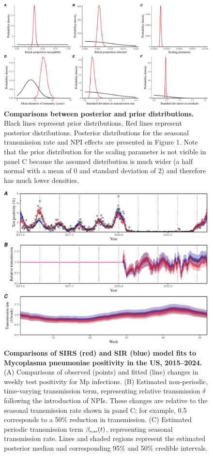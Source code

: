 \documentclass[12pt]{article}
\newcommand{\tsub}[2]{#1_{{\textrm{\tiny #2}}}}
\begin{document}
\pagebreak

\begin{figure}[!ht]
\includegraphics[width=\textwidth]{../figure1/figure1_posterior.pdf}
\caption{
\textbf{Comparisons between posterior and prior distributions.}
Black lines represent prior distributions.
Red lines represent posterior distributions.
Posterior distributions for the seasonal transmission rate and NPI effects are presented in Figure 1.
Note that the prior distribution for the scaling parameter is not visible in panel C because the assumed distribution is much wider (a half normal with a mean of 0 and standard deviation of 2) and therefore has much lower densities.
}
\end{figure}


\pagebreak

\begin{figure}[!ht]
\includegraphics[width=\textwidth]{../figure_sirs/figure_sirs_fit.pdf}
\caption{
\textbf{Comparisons of SIRS (red) and SIR (blue) model fits to Mycoplasma pneumoniae positivity in the US, 2015--2024.}
(A) Comparisons of observed (points) and fitted (line) changes in weekly test positivity for Mp infections.
(B) Estimated non-periodic, time-varying transmission term, representing relative transmission $\delta$ following the introduction of NPIs.
These changes are relative to the seasonal transmission rate shown in panel C;
for example, 0.5 corresponds to a 50\% reduction in transmission.
(C) Estimated periodic transmission term  $\tsub{\beta}{seas}(t)$, representing seasonal transmission rate.
Lines and shaded regions represent the estimated posterior median and corresponding 95\% and 50\% credible intervals.
}
\end{figure}

\pagebreak


\end{document}
